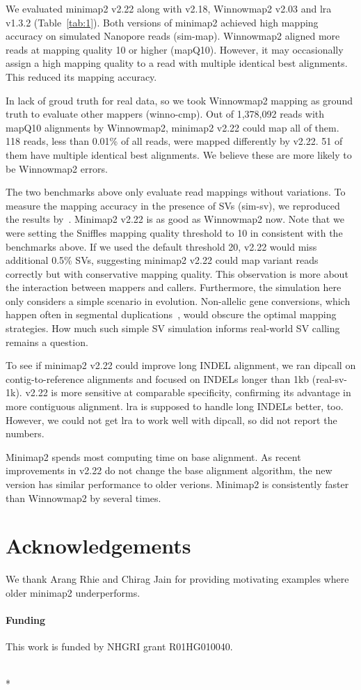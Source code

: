 \documentclass{bioinfo}
\begin{document}
We evaluated minimap2 v2.22 along with v2.18, Winnowmap2 v2.03 and lra v1.3.2
(Table~\ref{tab:1}). Both versions of minimap2 achieved high mapping accuracy on
simulated Nanopore reads (sim-map). Winnowmap2 aligned more reads at mapping
quality 10 or higher (mapQ10). However, it may occasionally assign a high mapping
quality to a read with multiple identical best alignments. This reduced its
mapping accuracy.

In lack of groud truth for real data, so we took Winnowmap2 mapping as ground
truth to evaluate other mappers (winno-cmp). Out of 1,378,092 reads with mapQ10
alignments by Winnowmap2, minimap2 v2.22 could map all of them. 118 reads, less
than 0.01\% of all reads, were mapped differently by v2.22. 51 of them have
multiple identical best alignments. We believe these are more likely to be
Winnowmap2 errors.

The two benchmarks above only evaluate read mappings without variations.
To measure the mapping accuracy in the presence of SVs (sim-sv), we reproduced
the results by~\citep{Jain2020.11.01.363887}. Minimap2 v2.22 is as good as
Winnowmap2 now. Note that we were setting the Sniffles mapping quality
threshold to 10 in consistent with the benchmarks above. If we used the
default threshold 20, v2.22 would miss additional 0.5\% SVs, suggesting
minimap2 v2.22 could map variant reads correctly but with conservative mapping
quality. This observation is more about the interaction between mappers and
callers. Furthermore, the simulation here only considers a simple scenario in
evolution. Non-allelic gene conversions, which happen often in segmental
duplications~\citep{Harpak:2017aa}, would obscure the optimal mapping
strategies. How much such simple SV simulation informs real-world SV calling
remains a question.

To see if minimap2 v2.22 could improve long INDEL alignment, we ran dipcall on
contig-to-reference alignments and focused on INDELs longer than 1kb
(real-sv-1k). v2.22 is more sensitive at comparable specificity, confirming its
advantage in more contiguous alignment. lra is supposed to handle long INDELs
better, too. However, we could not get lra to work well with dipcall, so did
not report the numbers.

Minimap2 spends most computing time on base alignment. As recent improvements
in v2.22 do not change the base alignment algorithm, the new version has similar
performance to older verions. Minimap2 is consistently faster than Winnowmap2
by several times.


\section*{Acknowledgements}
We thank Arang Rhie and Chirag Jain for providing motivating examples where
older minimap2 underperforms.

\paragraph{Funding\textcolon} This work is funded by NHGRI grant R01HG010040.

~\\*


\end{document}
